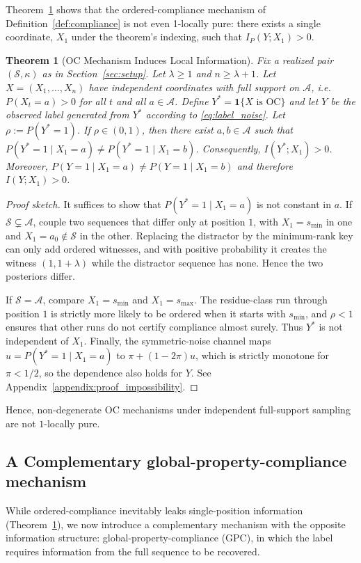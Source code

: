 \documentclass{article}
\theoremstyle{plain}
\newtheorem{theorem}{Theorem}[section]
\theoremstyle{definition}
\theoremstyle{remark}
\begin{document}
Theorem~\ref{thm:impossibility} shows that the ordered-compliance mechanism of Definition~\ref{def:compliance} is not even 1-locally pure: there exists a single coordinate, $X_1$ under the theorem's indexing, such that $I_P(Y;X_1)>0$.

\begin{theorem}[OC Mechanism Induces Local Information]
\label{thm:impossibility}
Fix a realized pair $(\mathcal{S},\kappa)$ as in Section~\ref{sec:setup}.
Let $\lambda \ge 1$ and $n \ge \lambda+1$.
Let $X=(X_1,\ldots,X_n)$ have independent coordinates with full support on
$\mathcal{A}$, i.e.\ $P(X_t=a)>0$ for all $t$ and all $a\in\mathcal{A}$.
Define
$Y^* = \mathbf{1}\{X \text{ is OC}\}$ and let $Y$ be the observed label generated from $Y^*$ according to
\eqref{eq:label_noise}. Let $\rho := P(Y^*=1)$.
If $\rho\in(0,1)$, then there exist $a,b\in\mathcal{A}$ such that $P(Y^*=1\mid X_1=a)\neq P(Y^*=1\mid X_1=b)$.
Consequently, $I(Y^*;X_1)>0$. Moreover, $P(Y=1\mid X_1=a)\neq P(Y=1\mid X_1=b)$ and therefore $I(Y;X_1)>0$.
\end{theorem}

\begin{proof}[Proof sketch]
It suffices to show that \(P(Y^*=1\mid X_1=a)\) is not constant in \(a\).
If \(\mathcal S\subsetneq\mathcal A\), couple two sequences that differ
only at position \(1\), with \(X_1=s_{\min}\) in one and
\(X_1=a_0\notin\mathcal S\) in the other. Replacing the distractor by the
minimum-rank key can only add ordered witnesses, and with positive
probability it creates the witness \((1,1+\lambda)\) while the distractor
sequence has none. Hence the two posteriors differ.

If \(\mathcal S=\mathcal A\), compare \(X_1=s_{\min}\) and
\(X_1=s_{\max}\). The residue-class run through position \(1\) is strictly
more likely to be ordered when it starts with \(s_{\min}\), and
\(\rho<1\) ensures that other runs do not certify compliance almost
surely. Thus \(Y^*\) is not independent of \(X_1\). Finally, the
symmetric-noise channel maps
\(u=P(Y^*=1\mid X_1=a)\) to \(\pi+(1-2\pi)u\), which is strictly monotone
for \(\pi<1/2\), so the dependence also holds for \(Y\). See
Appendix~\ref{appendix:proof_impossibility}.
\end{proof}

Hence, non-degenerate OC mechanisms under independent full-support sampling are not $1$-locally pure.

\subsection{A Complementary global-property-compliance mechanism}
\label{sec:parity}
While ordered-compliance inevitably leaks single-position information (Theorem~\ref{thm:impossibility}), we now introduce a complementary mechanism with the opposite information structure: global-property-compliance (GPC), in which the label requires information from the full sequence to be recovered.
\end{document}
